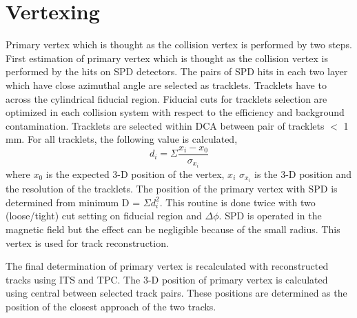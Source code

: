 \section{Vertexing}
\label{sec_3_vtx}
Primary vertex which is thought as the collision vertex is performed by two steps. 
First estimation of primary vertex which is thought as the collision vertex is performed by the hits on SPD detectors.
The pairs of SPD hits in each two layer which have close azimuthal angle are selected as tracklets.
Tracklets have to across the cylindrical fiducial region. 
Fiducial cuts for tracklets selection are optimized in each collision system with respect to the efficiency and background contamination.
Tracklets are selected within DCA between pair of tracklets $<$ 1 mm. 
For all tracklets, the following value is calculated,  
\begin{equation}
  d_{i} = \Sigma \frac{x_{i}-x_{0}}{\sigma_{x_{i}}}
\end{equation}
where $x_{0}$ is the expected 3-D position of the vertex, $x_{i}$ $\sigma_{x_{i}}$ is the 3-D position and the resolution of the tracklets. 
The position of the primary vertex with SPD is determined from minimum D = $\Sigma d_{i}^{2}$. 
This routine is done twice with two (loose/tight) cut setting on fiducial region and $\Delta\phi $. 
SPD is operated in the magnetic field but the effect can be negligible because of the small radius.
This vertex is used for track reconstruction. 

The final determination of primary vertex is recalculated with reconstructed tracks using ITS and TPC.  
The 3-D position of primary vertex is calculated using central between selected track pairs. 
These positions are determined as the position of the closest approach of the two tracks.  

